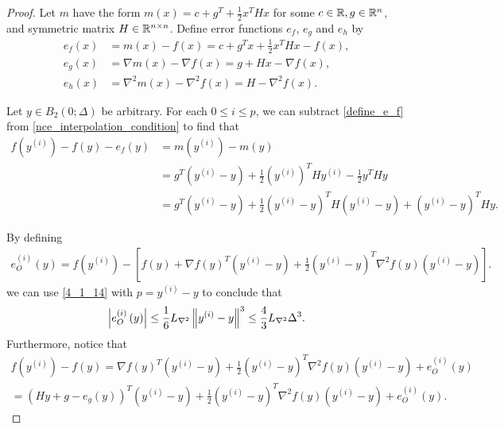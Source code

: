 \documentclass{article}
\begin{document}
\begin{proof}
Let $m$ have the form $m(x) = c + g^T + \frac 1 2 x^T H x$ for some 
$c \in \mathbb R, g \in \mathbb R^n$,  and symmetric matrix $H \in \mathbb R^{n \times n}$. 
Define error functions $e_f$, $e_g$ and $e_h$ by
\begin{align}
e_f(x) & = m(x)-f(x) = c + g^T x + \frac 1 2 x^T H x - f(x) \label{define_e_f}, \\
e_g(x) &= \nabla m(x)-\nabla f(x) = g + H x - \nabla f(x), \nonumber \\
e_h(x) &= \nabla^2 m(x)-\nabla^2 f(x) = H -\nabla^2 f(x). \nonumber
\end{align}

Let $y \in B_2(0; \Delta)$ be arbitrary.
For each $0 \le i \le p$, we can subtract \cref{define_e_f} from \cref{nce_interpolation_condition} to find that
\begin{align}
f\left(y^{(i)}\right) - f(y) - e_f(y)
&= m\left(y^{(i)}\right) - m(y) \nonumber \\
&= g^T\left(y^{(i)}-y\right)+\frac{1}{2}\left(y^{(i)}\right)^T H y^{(i)}-
\frac{1}{2} y^T H y\\
&=g^T  \left(y^{(i)} - y\right)  + \frac 1 2 \left(y^{(i)} - y\right)^T H \left(y^{(i)} - y\right) + \left(y^{(i)} - y\right)^T H y. \label{nec_eqn2}
\end{align}

By defining
\begin{align*}
e^{(i)}_O(y) = 
f\left(y^{(i)}\right) - \left[f(y) + \nabla f(y)^T \left(y^{(i)} - y\right) + \frac 1 2 \left(y^{(i)} - y\right)^T \nabla^2 f(y) \left(y^{(i)} - y\right)\right].
\end{align*}
we can use \cref{4_1_14} with  $p = y^{(i)} - y$ to conclude that
\begin{align}
\left|e^{(i)}_O\left(y\right) \right| \le \frac 1 6 {L_{\nabla^2}} \left\|y^{(i)} - y\right\|^3 \le \frac 4 3 {L_{\nabla^2}} \Delta^3 \label{nce_bound_rhs}.
\end{align}
Furthermore, notice that
\begin{align*}
f\left(y^{(i)}\right) - f(y)
= \nabla f(y)^T \left(y^{(i)} - y\right) + \frac 1 2 \left(y^{(i)} - y\right)^T \nabla^2 f(y) \left(y^{(i)} - y\right) + e^{(i)}_O\left(y\right) \\
= \left(Hy + g - e_g(y)\right)^T  \left(y^{(i)} - y\right) + \frac 1 2 \left(y^{(i)} - y\right)^T \nabla^2 f(y) \left(y^{(i)} - y\right) + e^{(i)}_O\left(y\right).
\end{align*}


\end{proof}
\end{document}
